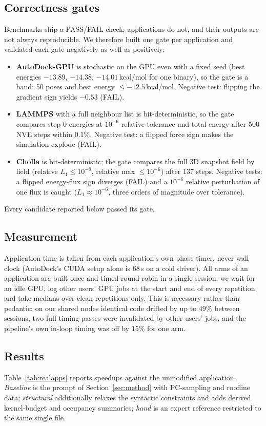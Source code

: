 \subsection{Correctness gates}
Benchmarks ship a PASS/FAIL check; applications do not, and their outputs are not always reproducible.
We therefore built one gate per application and validated each gate negatively as well as positively:
\begin{itemize}\itemsep2pt
  \item \textbf{AutoDock-GPU} is stochastic on the GPU even with a fixed seed (best energies
    $-13.89$, $-14.38$, $-14.01$\,kcal/mol for one binary), so the gate is a band: 50 poses and best
    energy $\le -12.5$\,kcal/mol. Negative test: flipping the gradient sign yields $-0.53$ (FAIL).
  \item \textbf{LAMMPS} with a full neighbour list is bit-deterministic, so the gate compares step-0
    energies at $10^{-6}$ relative tolerance and total energy after 500 NVE steps within $0.1\%$.
    Negative test: a flipped force sign makes the simulation explode (FAIL).
  \item \textbf{Cholla} is bit-deterministic; the gate compares the full 3D snapshot field by field
    (relative $L_1 \le 10^{-9}$, relative max $\le 10^{-6}$) after 137 steps. Negative tests: a flipped
    energy-flux sign diverges (FAIL) and a $10^{-6}$ relative perturbation of one flux is caught
    ($L_1 \approx 10^{-6}$, three orders of magnitude over tolerance).
\end{itemize}
Every candidate reported below passed its gate.

\subsection{Measurement}
Application time is taken from each application's own phase timer, never wall clock (AutoDock's CUDA
setup alone is 68\,s on a cold driver). All arms of an application are built once and timed
round-robin in a single session; we wait for an idle GPU, log other users' GPU jobs at the start and
end of every repetition, and take medians over clean repetitions only. This is necessary rather than
pedantic: on our shared nodes identical code drifted by up to $49\%$ between sessions, two full timing
passes were invalidated by other users' jobs, and the pipeline's own in-loop timing was off by $15\%$
for one arm.

\subsection{Results}
Table~\ref{tab:realapps} reports speedups against the unmodified application. \emph{Baseline} is the
prompt of Section~\ref{sec:method} with PC-sampling and roofline data; \emph{structural} additionally
relaxes the syntactic constraints and adds derived kernel-budget and occupancy summaries; \emph{hand}
is an expert reference restricted to the same single file.

